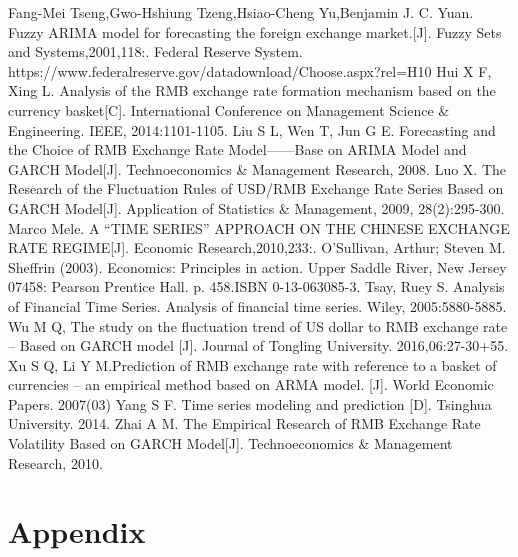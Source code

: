 \documentclass[12pt, a4paper, titlepage]{article}
\begin{document}
\begin{thebibliography}{9}
\bibitem{}  Fang-Mei Tseng,Gwo-Hshiung Tzeng,Hsiao-Cheng Yu,Benjamin J. C. Yuan. Fuzzy ARIMA model for forecasting the foreign exchange market.[J]. Fuzzy Sets and Systems,2001,118:.
\bibitem{}  Federal Reserve System. https://www.federalreserve.gov/datadownload/Choose.aspx?rel=H10 
\bibitem{}  Hui X F, Xing L. Analysis of the RMB exchange rate formation mechanism based on the currency basket[C]. International Conference on Management Science \& Engineering. IEEE, 2014:1101-1105. 
\bibitem{}  Liu S L, Wen T, Jun G E. Forecasting and the Choice of RMB Exchange Rate Model——Base on ARIMA Model and GARCH Model[J]. Technoeconomics \& Management Research, 2008.
\bibitem{}  Luo X. The Research of the Fluctuation Rules of USD/RMB Exchange Rate Series Based on GARCH Model[J]. Application of Statistics \& Management, 2009, 28(2):295-300.
\bibitem{}  Marco Mele. A “TIME SERIES” APPROACH ON THE CHINESE EXCHANGE RATE REGIME[J]. Economic Research,2010,233:.
\bibitem{}  O'Sullivan, Arthur; Steven M. Sheffrin (2003). Economics: Principles in action. Upper Saddle River, New Jersey 07458: Pearson Prentice Hall. p. 458.ISBN 0-13-063085-3. 
\bibitem{}  Tsay, Ruey S. Analysis of Financial Time Series. Analysis of financial time series. Wiley, 2005:5880-5885.
\bibitem{}  Wu M Q, The study on the fluctuation trend of US dollar to RMB exchange rate -- Based on GARCH model [J]. Journal of Tongling University. 2016,06:27-30+55.
\bibitem{}  Xu S Q, Li Y M.Prediction of RMB exchange rate with reference to a basket of currencies -- an empirical method based on ARMA model. [J]. World Economic Papers. 2007(03)
\bibitem{}  Yang S F. Time series modeling and prediction [D]. Tsinghua University. 2014.
\bibitem{}  Zhai A M. The Empirical Research of RMB Exchange Rate Volatility Based on GARCH Model[J]. Technoeconomics \& Management Research, 2010.
\end{thebibliography}


\section*{Appendix}
\end{document}
